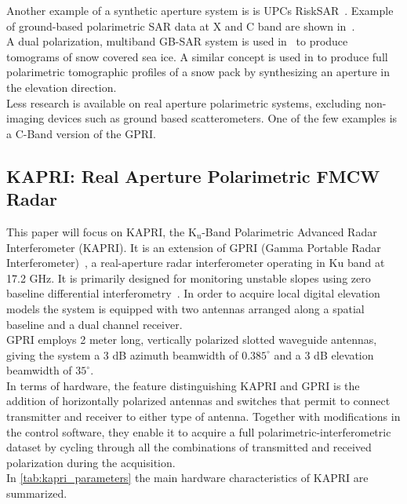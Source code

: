 Another example  of a synthetic aperture system is is UPCs RiskSAR~\cite{Iglesias2014, Aguasca2004,Pipia2007a,Pipia2009, Pipia2013,Iglesias2014}. Example of ground-based polarimetric SAR data at X and C band are shown in~\cite{Kang2009, Kang2010}.\\ A dual polarization, multiband GB-SAR system is used in~\cite{Yitayew2014} to produce tomograms of snow covered sea ice. A similar concept is used in\cite{Frey2015,Frey2016} to produce full polarimetric tomographic profiles of a snow pack by synthesizing an aperture in the elevation direction.\\
Less research is available on real aperture polarimetric systems, excluding non-imaging devices such as ground based scatterometers. One of the few examples is a C-Band version of the GPRI\cite{Cherukumilli2012}.
\subsection{KAPRI: Real Aperture Polarimetric FMCW Radar}
This paper will focus on KAPRI, the $\mathrm{K_u}$-Band Polarimetric Advanced Radar Interferometer (KAPRI)\cite{Baffelli2016a}. It is an extension of GPRI (Gamma Portable Radar Interferometer)~\cite{werner_gpri_2012,Strozzi2011, Werner2008}, a real-aperture radar interferometer operating in Ku band at 17.2 GHz. It is primarily designed 
for monitoring unstable slopes using zero baseline differential interferometry~\cite{Massonnet1993}. In order to acquire local digital elevation models the system is equipped with two antennas arranged along a spatial baseline and a dual channel receiver.\\
GPRI employs  2 meter long, vertically polarized slotted waveguide antennas, giving the system a 3 dB azimuth beamwidth of $0.385^\circ$ and a 3 dB elevation beamwidth of $35^\circ$.\\
In terms of hardware, the feature distinguishing KAPRI and GPRI is the addition of horizontally polarized antennas and switches that permit to connect transmitter and receiver to either type of antenna. Together with modifications in the control software, they enable it to acquire a full polarimetric-interferometric dataset by cycling through all the combinations of transmitted and received polarization during the acquisition.\\  In \autoref{tab:kapri_parameters} the main hardware characteristics of KAPRI are summarized.

